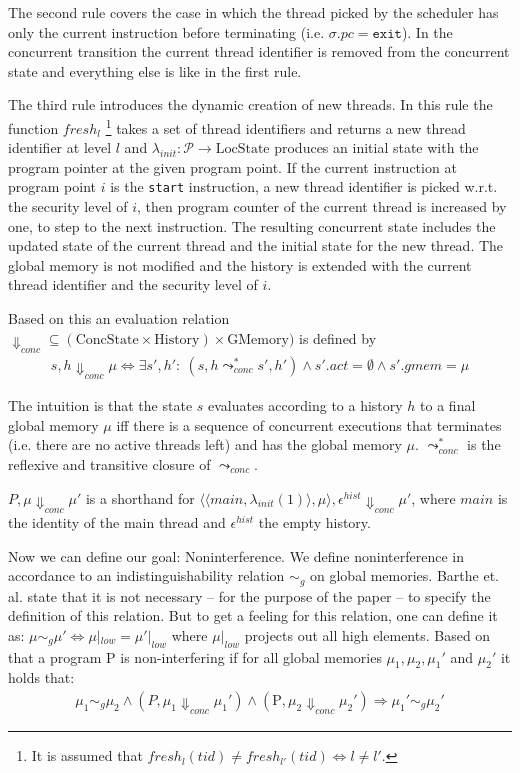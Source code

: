 \documentclass[a4paper,10pt]{llncs}
\begin{document}
The second rule covers the case in which the thread picked by the scheduler has only the current
instruction before terminating (i.e. $\sigma.pc = \mathtt{exit}$). In the concurrent transition
the current thread identifier is removed from the concurrent state and everything else is like in the
first rule.

The third rule introduces the dynamic creation of new threads. In this rule the function $fresh_{l}$
\footnote{It is assumed that $fresh_l(tid) \neq fresh_{l'}(tid) \Leftrightarrow l \neq l'$.}
takes a set of thread identifiers and returns a new thread identifier at level $l$ and $\lambda_{init} : \mathcal{P}
\rightarrow \text{LocState}$ produces an initial state with the program pointer at the given program point.
If the current instruction at program point $i$ is the \texttt{start} instruction, a new thread
identifier is picked w.r.t. the security level of $i$, then program counter of the current thread
is increased by one, to step to the next instruction. The resulting concurrent state includes the
updated state of the current thread and the initial state for the new thread. The global memory
is not modified and the history is extended with the current thread identifier and the security level of $i$.

Based on this an evaluation relation $\Downarrow_{conc} \subseteq (\text{ConcState} \times \text{History}) \times
\text{GMemory})$ is defined by
\begin{align*}
s, h \Downarrow_{conc} \mu \Leftrightarrow \exists s', h':\ (s,h \leadsto_{conc}^* s',h') \land s'.act = \emptyset \land s'.gmem = \mu
\end{align*}

The intuition is that the state $s$ evaluates according to a history $h$ to a final global memory $\mu$ iff there is a
sequence of concurrent executions that terminates (i.e. there are no active threads left) and has the
global memory $\mu$. $\leadsto_{conc}^*$ is the reflexive and transitive closure of $\leadsto_{conc}$.

$P, \mu \Downarrow_{conc} \mu'$ is a shorthand for $\langle\langle main,\lambda_{init}(1)\rangle,
\mu\rangle, \epsilon^{hist} \Downarrow_{conc} \mu'$, where $main$ is the identity of the main thread
and $\epsilon^{hist}$ the empty history.

Now we can define our goal: Noninterference. We define noninterference
in accordance to an indistinguishability relation $\sim_g$ on global memories.
Barthe et. al. state that it is not necessary -- for the purpose of the paper --
to specify the definition of this relation. But to get a feeling for this
relation, one can define it as: $\mu \sim_g \mu' \Leftrightarrow \mu|_{low} =
\mu'|_{low}$ where $\mu|_{low}$ projects out all high elements. Based on that
a program P is non-interfering if for all global memories $\mu_1, \mu_2, \mu_1'$
and $\mu_2'$ it holds that:
\begin{align*}
\mu_1 \sim_g \mu_2 \land (P,\mu_1 \Downarrow_{conc} \mu_1') \land (\text{P},\mu_2 \Downarrow_{conc} \mu_2') \Rightarrow \mu_1' \sim_g \mu_2'
\end{align*}
\end{document}
